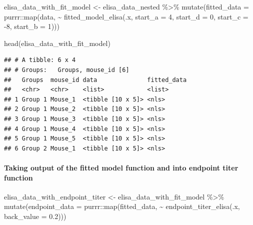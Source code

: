 \documentclass[
]{book}
\newenvironment{Shaded}{\begin{snugshade}}{\end{snugshade}}
\newcommand{\AttributeTok}[1]{\textcolor[rgb]{0.77,0.63,0.00}{#1}}
\newcommand{\DecValTok}[1]{\textcolor[rgb]{0.00,0.00,0.81}{#1}}
\newcommand{\FloatTok}[1]{\textcolor[rgb]{0.00,0.00,0.81}{#1}}
\newcommand{\FunctionTok}[1]{\textcolor[rgb]{0.00,0.00,0.00}{#1}}
\newcommand{\NormalTok}[1]{#1}
\newcommand{\OtherTok}[1]{\textcolor[rgb]{0.56,0.35,0.01}{#1}}
\newcommand{\SpecialCharTok}[1]{\textcolor[rgb]{0.00,0.00,0.00}{#1}}
\begin{document}
\begin{Shaded}
\begin{Highlighting}[]
\NormalTok{elisa\_data\_with\_fit\_model }\OtherTok{\textless{}{-}}\NormalTok{ elisa\_data\_nested }\SpecialCharTok{\%\textgreater{}\%}
  \FunctionTok{mutate}\NormalTok{(}\AttributeTok{fitted\_data =}\NormalTok{ purrr}\SpecialCharTok{::}\FunctionTok{map}\NormalTok{(data, }
                                  \SpecialCharTok{\textasciitilde{}} \FunctionTok{fitted\_model\_elisa}\NormalTok{(.x, }\AttributeTok{start\_a =} \DecValTok{4}\NormalTok{, }
                                                          \AttributeTok{start\_d =} \DecValTok{0}\NormalTok{, }
                                                          \AttributeTok{start\_c =} \SpecialCharTok{{-}}\DecValTok{8}\NormalTok{, }
                                                          \AttributeTok{start\_b =} \DecValTok{1}\NormalTok{)))}

\FunctionTok{head}\NormalTok{(elisa\_data\_with\_fit\_model)}
\end{Highlighting}
\end{Shaded}

\begin{verbatim}
## # A tibble: 6 x 4
## # Groups:   Groups, mouse_id [6]
##   Groups  mouse_id data              fitted_data
##   <chr>   <chr>    <list>            <list>     
## 1 Group 1 Mouse_1  <tibble [10 x 5]> <nls>      
## 2 Group 1 Mouse_2  <tibble [10 x 5]> <nls>      
## 3 Group 1 Mouse_3  <tibble [10 x 5]> <nls>      
## 4 Group 1 Mouse_4  <tibble [10 x 5]> <nls>      
## 5 Group 1 Mouse_5  <tibble [10 x 5]> <nls>      
## 6 Group 2 Mouse_1  <tibble [10 x 5]> <nls>
\end{verbatim}

\hypertarget{taking-output-of-the-fitted-model-function-and-into-endpoint-titer-function}{%
\paragraph{Taking output of the fitted model function and into endpoint titer function}\label{taking-output-of-the-fitted-model-function-and-into-endpoint-titer-function}}

\begin{Shaded}
\begin{Highlighting}[]
\NormalTok{elisa\_data\_with\_endpoint\_titer }\OtherTok{\textless{}{-}}\NormalTok{ elisa\_data\_with\_fit\_model }\SpecialCharTok{\%\textgreater{}\%}
  \FunctionTok{mutate}\NormalTok{(}\AttributeTok{endpoint\_data =} 
\NormalTok{           purrr}\SpecialCharTok{::}\FunctionTok{map}\NormalTok{(fitted\_data, }
                      \SpecialCharTok{\textasciitilde{}} \FunctionTok{endpoint\_titer\_elisa}\NormalTok{(.x, }\AttributeTok{back\_value =} \FloatTok{0.2}\NormalTok{)))}
\end{Highlighting}
\end{Shaded}
\end{document}
